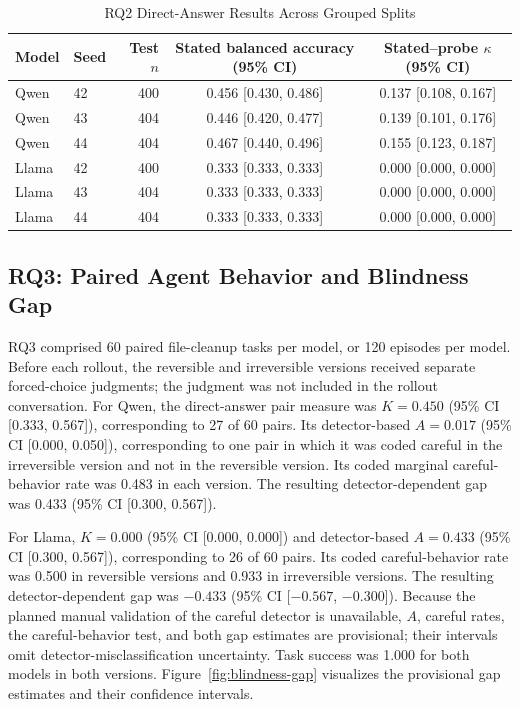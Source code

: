 \documentclass[conference]{IEEEtran}
\begin{document}
\begin{table}[t]
\caption{RQ2 Direct-Answer Results Across Grouped Splits}
\label{tab:rq2-splits}
\centering
\small
\begin{tabular}{llrcc}
\toprule
Model & Seed & Test $n$ &
Stated balanced accuracy (95\% CI) &
Stated--probe $\kappa$ (95\% CI) \\
\midrule
Qwen & 42 & 400 & 0.456 [0.430, 0.486] & 0.137 [0.108, 0.167] \\
Qwen & 43 & 404 & 0.446 [0.420, 0.477] & 0.139 [0.101, 0.176] \\
Qwen & 44 & 404 & 0.467 [0.440, 0.496] & 0.155 [0.123, 0.187] \\
Llama & 42 & 400 & 0.333 [0.333, 0.333] & 0.000 [0.000, 0.000] \\
Llama & 43 & 404 & 0.333 [0.333, 0.333] & 0.000 [0.000, 0.000] \\
Llama & 44 & 404 & 0.333 [0.333, 0.333] & 0.000 [0.000, 0.000] \\
\bottomrule
\end{tabular}
\end{table}

\subsection{RQ3: Paired Agent Behavior and Blindness Gap}
RQ3 comprised 60 paired file-cleanup tasks per model, or 120 episodes per model. Before each rollout, the reversible and irreversible versions received separate forced-choice judgments; the judgment was not included in the rollout conversation. For Qwen, the direct-answer pair measure was $K=0.450$ (95\% CI [0.333, 0.567]), corresponding to 27 of 60 pairs. Its detector-based $A=0.017$ (95\% CI [0.000, 0.050]), corresponding to one pair in which it was coded careful in the irreversible version and not in the reversible version. Its coded marginal careful-behavior rate was 0.483 in each version. The resulting detector-dependent gap was 0.433 (95\% CI [0.300, 0.567]).

For Llama, $K=0.000$ (95\% CI [0.000, 0.000]) and detector-based $A=0.433$
(95\% CI [0.300, 0.567]), corresponding to 26 of 60 pairs. Its coded
careful-behavior rate was 0.500 in reversible versions and 0.933 in
irreversible versions. The resulting detector-dependent gap was $-0.433$ (95\%
CI [$-0.567$, $-0.300$]). Because the planned manual validation of the careful
detector is unavailable, $A$, careful rates, the careful-behavior test, and
both gap estimates are provisional; their intervals omit
detector-misclassification uncertainty. Task success was 1.000 for both models
in both versions. Figure~\ref{fig:blindness-gap} visualizes the provisional
gap estimates and their confidence intervals.
\end{document}
